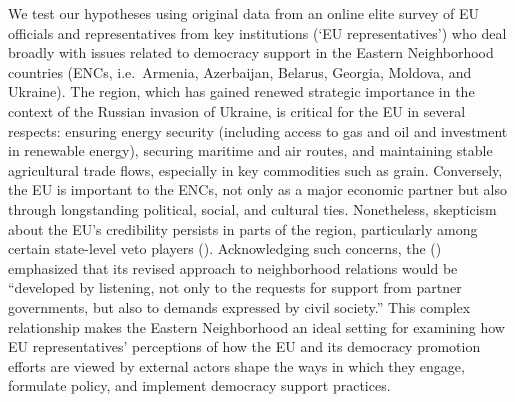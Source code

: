 \documentclass[
  letterpaper,
  DIV=11,
  numbers=noendperiod]{scrartcl}
\begin{document}
We test our hypotheses using original data from an online elite survey
of EU officials and representatives from key institutions (`EU
representatives') who deal broadly with issues related to democracy
support in the Eastern Neighborhood countries (ENCs, i.e.~Armenia,
Azerbaijan, Belarus, Georgia, Moldova, and Ukraine). The region, which
has gained renewed strategic importance in the context of the Russian
invasion of Ukraine, is critical for the EU in several respects:
ensuring energy security (including access to gas and oil and investment
in renewable energy), securing maritime and air routes, and maintaining
stable agricultural trade flows, especially in key commodities such as
grain. Conversely, the EU is important to the ENCs, not only as a major
economic partner but also through longstanding political, social, and
cultural ties. Nonetheless, skepticism about the EU's credibility
persists in parts of the region, particularly among certain state-level
veto players (). Acknowledging such concerns, the
() emphasized that its revised
approach to neighborhood relations would be ``developed by listening,
not only to the requests for support from partner governments, but also
to demands expressed by civil society.'' This complex relationship makes
the Eastern Neighborhood an ideal setting for examining how EU
representatives' perceptions of how the EU and its democracy promotion
efforts are viewed by external actors shape the ways in which they
engage, formulate policy, and implement democracy support practices.
\end{document}
